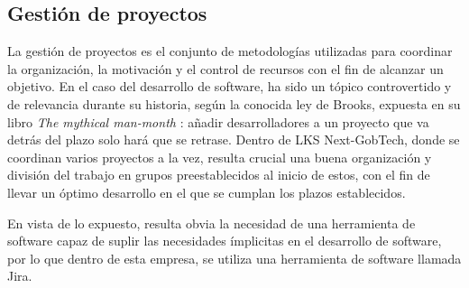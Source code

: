 \subsection{Gestión de proyectos}

La gestión de proyectos es el conjunto de metodologías utilizadas para coordinar la organización, la motivación y el control de recursos con el fin de alcanzar un objetivo. En el caso del desarrollo de software, ha sido un tópico controvertido y de relevancia durante su historia, según la conocida ley de Brooks, expuesta en su libro \textit{The mythical man-month} \cite{Brooks1975}: añadir desarrolladores a un proyecto que va detrás del plazo solo hará que se retrase. Dentro de LKS Next-GobTech, donde se coordinan varios proyectos a la vez, resulta crucial una buena organización y división del trabajo en grupos preestablecidos al inicio de estos, con el fin de llevar un óptimo desarrollo en el que se cumplan los plazos establecidos. 

En vista de lo expuesto, resulta obvia la necesidad de una herramienta de software capaz de suplir las necesidades ímplicitas en el desarrollo de software, por lo que dentro de esta empresa, se utiliza una herramienta de software llamada Jira. 